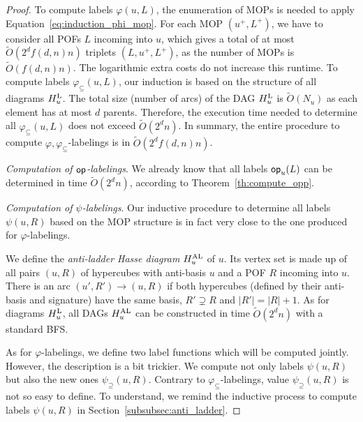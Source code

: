 \documentclass[a4paper,UKenglish,numberwithinsect,cleveref, autoref]{lipics-v2021}
\newcommand{\card}[1]{\left| #1 \right|}
\newcommand{\opp}{\mbox{\textsf{op}}}
\newcommand{\hul}{H_u^{\mbox{\scriptsize{L}}}}
\newcommand{\hual}{H_u^{\mbox{\scriptsize{AL}}}}
\newcommand{\varphis}{\varphi_{\subseteq}}
\newcommand{\psis}{\psi_{\supseteq}}
\begin{document}
\begin{proof}
To compute labels $\varphi(u,L)$, the enumeration of MOPs is needed to apply Equation~\eqref{eq:induction_phi_mop}. For each MOP $(u^+,L^+)$, we have to consider all POFs $L$ incoming into $u$, which gives a total of at most $\tilde{O}(2^df(d,n)n)$ triplets $(L,u^+,L^+)$, as the number of MOPs is $\tilde{O}(f(d,n)n)$. The logarithmic extra costs do not increase this runtime. To compute labels $\varphis(u,L)$, our induction is based on the structure of all diagrams $\hul$. The total size (number of arcs) of the DAG $\hul$ is $\tilde{O}(N_u)$ as each element has at most $d$ parents. Therefore, the execution time needed to determine all $\varphis(u,L)$ does not exceed $\tilde{O}(2^dn)$. In summary, the entire procedure to compute $\varphi,\varphis$-labelings is in $\tilde{O}(2^df(d,n)n)$.

\textit{Computation of $\opp$-labelings}. We already know that all labels $\opp_u(L)$ can be determined in time $\tilde{O}(2^dn)$, according to Theorem~\ref{th:compute_opp}.

\textit{Computation of $\psi$-labelings}. Our inductive procedure to determine all labels $\psi(u,R)$ based on the MOP structure is in fact very close to the one produced for $\varphi$-labelings.

We define the \textit{anti-ladder Hasse diagram} $\hual$ of $u$. Its vertex set is made up of all pairs $(u,R)$ of hypercubes with anti-basis $u$ and a POF $R$ incoming into $u$. There is an arc $(u',R')\rightarrow (u,R)$ if both hypercubes (defined by their anti-basis and signature) have the same basis, $R' \supsetneq R$ and $\card{R'} = \card{R} + 1$. As for diagrams $\hul$, all DAGs $\hual$ can be constructed in time $\tilde{O}(2^dn)$ with a standard BFS.

As for $\varphi$-labelings, we define two label functions which will be computed jointly. However, the description is a bit trickier. We compute not only labels $\psi(u,R)$ but also the new ones $\psis(u,R)$. Contrary to $\varphis$-labelings, value $\psis(u,R)$ is not so easy to define. To understand, we remind the inductive process to compute labels $\psi(u,R)$ in Section~\ref{subsubsec:anti_ladder}.


\end{proof}
\end{document}
